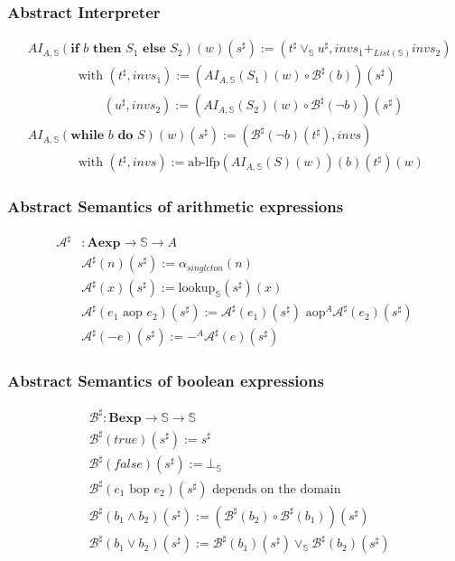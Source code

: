 \documentclass{beamer}
\begin{document}
\begin{frame}
    \frametitle{Abstract Interpreter}
\begin{align*}
&AI_{A, \mathbb{S}} (\textbf {if } b \textbf { then } S_1 \textbf { else } S_2) (w) (s^{\sharp}) := (t^{\sharp} \vee_{\mathbb{S}} u^{\sharp}, invs_1 +_{List(\mathbb{S})} invs_2) \\
& \qquad \qquad \text{with } (t^{\sharp}, invs_1) := (AI_{A, \mathbb{S}} ( S_1 ) (w) \circ \mathcal{B}^{\sharp} ( b )) (s^{\sharp}) \\
& \qquad \qquad \qquad (u^{\sharp}, invs_2) := (AI_{A, \mathbb{S}} ( S_2 ) (w) \circ \mathcal{B}^{\sharp} ( \neg b )) (s^{\sharp}) \\
&AI_{A, \mathbb{S}} (\textbf {while } b \textbf { do } S) (w) (s^{\sharp}) := (\mathcal{B}^{\sharp} ( \neg b ) (t^{\sharp}), invs)\\
& \qquad \qquad \text{with } (t^{\sharp}, invs) := \text{ab-lfp} (AI_{A, \mathbb{S}} ( S ) (w)) (b) (t^{\sharp}) (w)
\end{align*}
\end{frame}


\begin{frame}
    \frametitle{Abstract Semantics of arithmetic expressions}
    \begin{align*} 
     \mathcal{A}^{\sharp} &: \mathbf{A e x p} \rightarrow \mathbb{S} \rightarrow A \\
    & \mathcal{A}^{\sharp}(n)(s^{\sharp}) := \alpha_{singleton}(n)\\
    & \mathcal{A}^{\sharp} (x) (s^{\sharp}) := \text{lookup}_\mathbb{S}(s^{\sharp})(x) \\
    & \mathcal{A}^{\sharp} ( e_1 \text{ aop } e_2 ) (s^{\sharp}) := \mathcal{A}^{\sharp} (e_1) (s^{\sharp}) \text{ aop}^A \mathcal{A}^{\sharp} (e_2) (s^{\sharp})\\
    & \mathcal{A}^{\sharp} ( -e ) (s^{\sharp}) := -^A \mathcal{A}^{\sharp} (e) (s^{\sharp})
\end{align*}
\end{frame}

\begin{frame}
    \frametitle{Abstract Semantics of boolean expressions}
    \begin{align*} 
    & \mathcal{B}^{\sharp}: \mathbf{B e x p} \rightarrow \mathbb{S} \rightarrow \mathbb{S} \\
    & \mathcal{B}^{\sharp} (true) (s^{\sharp}) := s^{\sharp} \\
    & \mathcal{B}^{\sharp} (false) (s^{\sharp}) := \bot_\mathbb{S} \\
    & \mathcal{B}^{\sharp} ( e_1 \text{ bop } e_2 ) (s^{\sharp}) \text{ depends on the domain} \\
    & \mathcal{B}^{\sharp} ( b_1 \land b_2 ) (s^{\sharp}) := (\mathcal{B}^{\sharp} ( b_2 ) \circ \mathcal{B}^{\sharp} ( b_1 )) (s^{\sharp}) \\
    & \mathcal{B}^{\sharp} ( b_1 \lor b_2 ) (s^{\sharp}) := \mathcal{B}^{\sharp} ( b_1) (s^{\sharp}) \vee_\mathbb{S} \mathcal{B}^{\sharp} ( b_2) (s^{\sharp})
\end{align*}
\end{frame}
\end{document}
